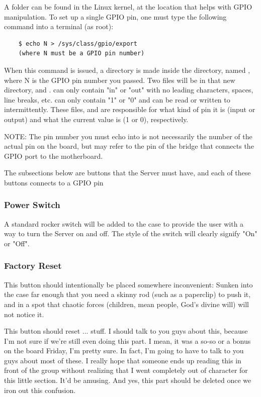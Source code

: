 A folder can be found in the Linux kernel, at the location 
 that helps with GPIO manipulation. To set up a single
GPIO pin, one must type the following command into a terminal (as root):

\begin{lstlisting}
	$ echo N > /sys/class/gpio/export
	(where N must be a GPIO pin number)
\end{lstlisting}

When this command is issued, a directory is made inside the  directory,
named , where N is the GPIO pin number you passed. Two files will be
in that new directory,  and . 
can only contain "in" or "out" with no leading characters, spaces, line breaks, etc.
 can only contain "1" or "0" and can be read or written to intermittently.
These files,  and  are responsible for what kind
of pin it is (input or output) and what the current value is (1 or 0), respectively.

NOTE: The pin number you must echo into  is not 
necessarily the number of the actual pin on the board, but may refer to the pin
of the bridge that connects the GPIO port to the motherboard.

The subsections below are buttons that the Server must have, and each of these buttons
connects to a GPIO pin


\subsubsection{Power Switch}
A standard rocker switch will be added to the case to provide the user with a way
to turn the Server on and off. The style of the switch will clearly signify "On" 
or "Off".

\subsubsection{Factory Reset}
This button should intentionally be placed somewhere inconvenient: Sunken into the case
far enough that you need a skinny rod (such as a paperclip) to push it, and in a spot
that chaotic forces (children, mean people, God's divine will) will not notice it.


This button should reset ... stuff. I should talk to you guys about this, because
I'm not sure if we're still even doing this part. I mean, it was a so-so or a bonus
on the board Friday, I'm pretty sure. In fact, I'm going to have to talk to you guys
about most of these. I really hope that someone ends up reading this in front of the 
group without realizing that I went completely out of character for this little
section. It'd be amusing. And yes, this part should be deleted once we iron out this 
confusion.

